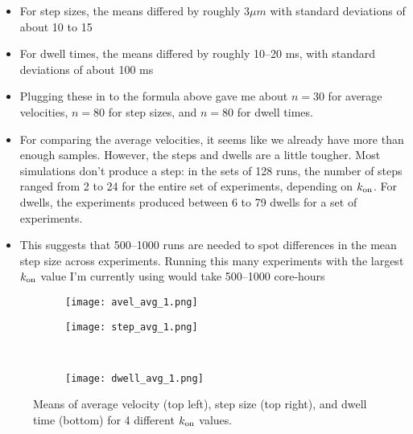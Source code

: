 \documentclass{article}
\newcommand{\tn}{\textnormal}
\begin{document}
\begin{itemize}
\begin{itemize}
  \item For step sizes, the means differed by roughly $3 \mu m$ with
    standard deviations of about 10 to 15
  \item For dwell times, the means differed by roughly 10--20 ms, with
    standard deviations of about 100 ms
  \item Plugging these in to the formula above gave me about $n=30$
    for average velocities, $n=80$ for step sizes, and $n=80$ for
    dwell times.
  \item For comparing the average velocities, it seems like we already have
    more than enough samples. However, the steps and dwells are a
    little tougher. Most simulations don't produce a step: in the sets
    of 128 runs, the number of steps ranged from 2 to 24 for the
    entire set of experiments, depending on $k_\tn{on}$. For dwells,
    the experiments produced between 6 to 79 dwells for a set of
    experiments.
  \item This suggests that 500--1000 runs are needed to spot
    differences in the mean step size across experiments. Running this
    many experiments with the largest $k_\tn{on}$ value I'm currently
    using would take 500--1000 core-hours
  \end{itemize}
\end{itemize}

\begin{figure}[h]
  \centering
  \begin{subfigure}{0.49\textwidth}
    \texttt{[image: avel\_avg\_1.png]}
  \end{subfigure}
  \hfill
  \begin{subfigure}{0.49\textwidth}
    \texttt{[image: step\_avg\_1.png]}
  \end{subfigure}
  \\
  \begin{subfigure}{0.49\textwidth}
    \texttt{[image: dwell\_avg\_1.png]}
  \end{subfigure}
  \label{fig:stats}
  \caption{Means of average velocity (top left), step size (top
    right), and dwell time (bottom) for 4 different $k_\tn{on}$
    values.}
\end{figure}



\end{document}
